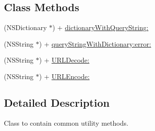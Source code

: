 \subsection*{Class Methods}
\begin{DoxyCompactItemize}
\item 
(N\-S\-Dictionary $\ast$) + \hyperlink{interface_f_b_s_d_k_utility_a2db20496809c545b0488a2034b6d9ddf}{dictionary\-With\-Query\-String\-:}
\item 
(N\-S\-String $\ast$) + \hyperlink{interface_f_b_s_d_k_utility_aec88416ed4a6b25ba45cf25c85d1835d}{query\-String\-With\-Dictionary\-:error\-:}
\item 
(N\-S\-String $\ast$) + \hyperlink{interface_f_b_s_d_k_utility_ad228bd3c5c619481fdc05d87c530bcd4}{U\-R\-L\-Decode\-:}
\item 
(N\-S\-String $\ast$) + \hyperlink{interface_f_b_s_d_k_utility_a4ca5debbcfbb8dbeeab93fece42cf57a}{U\-R\-L\-Encode\-:}
\end{DoxyCompactItemize}


\subsection{Detailed Description}
Class to contain common utility methods. 

